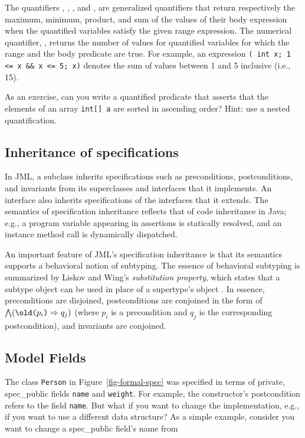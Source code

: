 \documentclass[twocolumn]{article}
\def\OLD#1{\texttt{\char'134old({#1})}}
\begin{document}
The quantifiers {\MAX}, {\MIN}, {\PRODUCT}, and {\SUM}, are
generalized quantifiers that return respectively the maximum, minimum,
product, and sum of the values of their body expression when the quantified
variables satisfy the given range expression.  The numerical
quantifier, {\NUMOF}, returns the number of values for quantified
variables for which the range and the body predicate are true.  For
example, an expression \texttt{({\SUM} int x; 1 <= x \&\& x <= 5; x)}
denotes the sum of values between 1 and 5 inclusive (i.e., 15).

As an exercise, can you write a quantified predicate that asserts that the
elements of an array \texttt{int[] a} are sorted in ascending order? 
Hint: use a nested quantification.
  
\subsection{Inheritance of specifications}

In JML, a subclass inherits specifications such as preconditions,
postconditions, and invariants from its superclasses and interfaces
that it implements.  An interface also inherits specifications of the
interfaces that it extends.
The semantics of specification inheritance
reflects that of code inheritance in Java; e.g., a program variable
appearing in assertions is statically resolved, and an instance method
call is dynamically dispatched.

An important feature of JML's specification inheritance is that its
semantics supports a behavioral notion of subtyping. The essence of
behavioral subtyping is summarized by Liskov and Wing's
\emph{substitution property}, which states that a subtype object can
be used in place of a supertype's object \cite{Liskov-Wing94}.  In
essence, preconditions are disjoined, postconditions are conjoined in
the form of $\bigwedge(\OLD{$p_i$} \Rightarrow q_j)$ (where $p_i$ is a
precondition and $q_j$ is the corresponding postcondition), and
invariants are conjoined.

\subsection{Model Fields}

The class \texttt{Person} in Figure~\ref{fig-formal-spec} was
specified in terms of private, spec\_public fields \texttt{name} and
\texttt{weight}. 
For example, the constructor's postcondition refers to the field
\texttt{name}. But what if you want to change the implementation,
e.g., if you want to use a different data structure?  As a simple
example, consider you want to change a spec\_public field's name from
\end{document}
